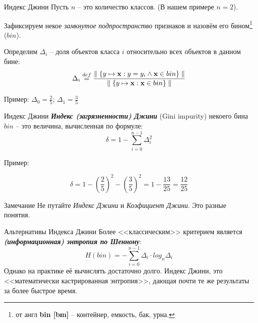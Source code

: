 \documentclass{beamer}
\newcommand{\termdef}[1]{\textbf{\textit{#1}}}
\newcommand{\term}{\textit}
\begin{document}
\begin{frame}{Индекс Джини}
  \small
  Пусть $n$ -- это количество классов. 
  (В нашем примере $n=2$).
  
  Зафиксируем некое \term{замкнутое подпространство} признаков и назовём его 
  бином\footnote{от англ \textbf{bin [bɪn]} -- контейнер, емкость, бак, урна.}
  ($bin$).
  
  Определим $\Delta_i$ -- доля объектов класса $i$ относительно всех объектов в данном бине:
  \begin{equation}
  \Delta_i \stackrel{def}{=} \frac{ \parallel \{y \mapsto \bold x : y = y_i \wedge \bold x \in bin \} \parallel}
  {
  	\parallel \{y \mapsto \bold x :  \bold x \in bin \} \parallel
  }
  \end{equation}	
 \begin{center}  
	  \begin{tikzpicture}[scale=1.5]
	  
	  \end{tikzpicture} 
	  Пример:
	    $\Delta_0 = \frac{2}{5}$; 
	  $\Delta_1 = \frac{3}{5}$
  \end{center}
	
\end{frame}

\begin{frame}{Индекс Джини}
    \small
	\termdef{Индекс (загрязненности) Джини} (Gini impurity) 
	некоего бина $bin$ -- это величина, вычисленная по формуле:
	\begin{equation}
	\delta = 1 - \sum_{i=0}^{n-1} \Delta_i ^ 2
	\end{equation}
	
	
	\begin{center}
	Пример:
		\begin{tikzpicture}[scale=1.5]
		
		\end{tikzpicture} 
	\end{center}
	
	\begin{equation*}
		\delta = 1 - \left( \frac{2}{5}\right)^2 - \left( \frac{3}{5}\right)^2 = 
		1 - \frac{13}{25} = \frac{12}{25} 
	\end{equation*}
	
	
	\begin{block}{Замечание}
		Не путайте \term{Индекс Джини} и 
		\term{Коэфициент Джини}. Это разные понятия.
	\end{block}
\end{frame}


\begin{frame}{Альтернативы Индекса Джини}
	Более <<классическим>> критерием является 
	\termdef{(информационная) энтропия по Шеннону}:
	\begin{equation}
	H(bin) = - \sum_{i=0}^{n-1} \Delta_i \cdot log_n \Delta_i 
	\end{equation}
	Однако на практике её вычислять достаточно долго. 
	Индекс Джини, это <<математически кастрированная энтропия>>,
	дающая почти те же результаты за более быстрое время.
	


\end{frame}
\end{document}
